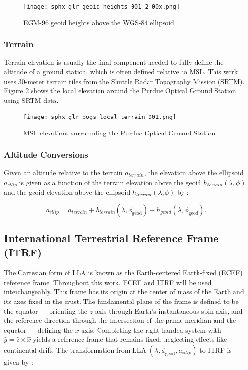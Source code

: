 \begin{figure}[ht]
  \centering
  \texttt{[image: sphx\_glr\_geoid\_heights\_001\_2\_00x.png]}
  \caption{EGM-96 geoid heights above the WGS-84 ellipsoid}
  \label{fig:geoid_shape}
\end{figure}

\subsubsection{Terrain}

Terrain elevation is usually the final component needed to fully define the altitude of a ground station, which is often defined relative to MSL. This work uses $30$-meter terrain tiles from the Shuttle Radar Topography Mission (SRTM). Figure \ref{fig:pogs_terrain} shows the local elevation around the Purdue Optical Ground Station using SRTM data.

\begin{figure}[ht]
  \centering
  \texttt{[image: sphx\_glr\_pogs\_local\_terrain\_001.png]}
  \caption{MSL elevations surrounding the Purdue Optical Ground Station}
  \label{fig:pogs_terrain}
\end{figure}

\subsubsection{Altitude Conversions}

Given an altitude relative to the terrain $a_{terrain}$, the elevation above the ellipsoid $a_{ellip}$ is given as a function of the terrain elevation above the geoid $h_{terrain}(\lambda, \phi)$ and the geoid elevation above the ellipsoid $h_{terrain}(\lambda, \phi)$ by \cite{vallado4ed}:

\begin{equation} \label{eq:altitude_above_ellipsoid}
  a_{ellip} = a_{terrain} + h_{terrain}(\lambda, \phi_\mathrm{geod}) + h_{geoid}(\lambda, \phi_\mathrm{geod}).
\end{equation}

\subsection{International Terrestrial Reference Frame (ITRF)}

The Cartesian form of LLA is known as the Earth-centered Earth-fixed (ECEF) reference frame. Throughout this work, ECEF and ITRF will be used interchangeably. This frame has its origin at the center of mass of the Earth and its axes fixed in the crust. The
fundamental plane of the frame is defined to be the equator ---  orienting the $z$-axis through Earth's
instantaneous spin axis, and the reference direction through the intersection of the prime meridian
and the equator ---  defining the $x$-axis. Completing the right-handed system with $\hat{y} = \hat{z} \times \hat{x}$ yields a
reference frame that remains fixed, neglecting effects like continental drift. The transformation from LLA $\left( \lambda, \phi_\mathrm{geod}, a_{ellip} \right)$ to ITRF is given by \cite{vallado4ed}:

